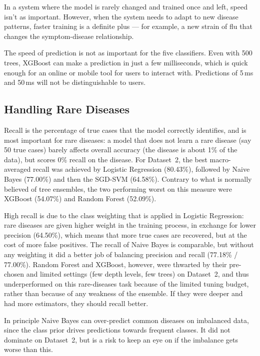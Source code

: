 In a system where the model is rarely changed and trained once and left, speed isn't as important. However, when the system needs to adapt to new disease patterns, faster training is a definite plus --- for example, a new strain of flu that changes the symptom-disease relationship.

The speed of prediction is not as important for the five classifiers. Even with 500 trees, XGBoost can make a prediction in just a few milliseconds, which is quick enough for an online or mobile tool for users to interact with. Predictions of 5\,ms and 50\,ms will not be distinguishable to users.

\subsection{Handling Rare Diseases}

Recall is the percentage of true cases that the model correctly identifies, and is most important for rare diseases: a model that does not learn a rare disease (say 50 true cases) barely affects overall accuracy (the disease is about 1\% of the data), but scores 0\% recall on the disease. For Dataset~2, the best macro-averaged recall was achieved by Logistic Regression (80.43\%), followed by Naive Bayes (77.00\%) and then the SGD-SVM (64.58\%). Contrary to what is normally believed of tree ensembles, the two performing worst on this measure were XGBoost (54.07\%) and Random Forest (52.09\%).

High recall is due to the class weighting that is applied in Logistic Regression: rare diseases are given higher weight in the training process, in exchange for lower precision (64.50\%), which means that more true cases are recovered, but at the cost of more false positives. The recall of Naive Bayes is comparable, but without any weighting it did a better job of balancing precision and recall (77.18\% / 77.00\%). Random Forest and XGBoost, however, were thwarted by their pre-chosen and limited settings (few depth levels, few trees) on Dataset~2, and thus underperformed on this rare-diseases task because of the limited tuning budget, rather than because of any weakness of the ensemble. If they were deeper and had more estimators, they should recall better.

In principle Naive Bayes can over-predict common diseases on imbalanced data, since the class prior drives predictions towards frequent classes. It did not dominate on Dataset~2, but is a risk to keep an eye on if the imbalance gets worse than this.

